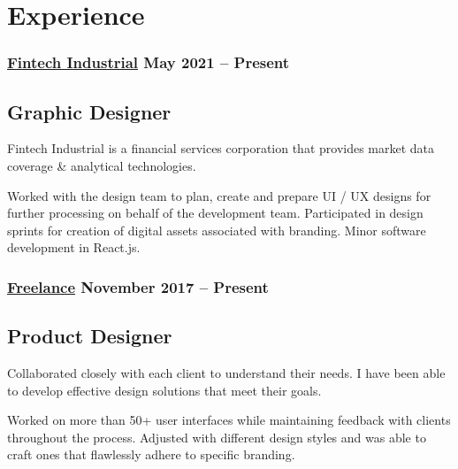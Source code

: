 \section*{Experience}
%
%
%
\subsubsection*{
  \href{https://www.linkedin.com/company/fintech-industrial/}{Fintech Industrial}
  \hspace*{\fill}
  May 2021 -- Present
}
\subsection*{Graphic Designer}
Fintech Industrial is a financial services corporation that provides market data coverage \& analytical technologies.
\smallskip
\begin{tasks}
  \task Worked with the design team to plan, create and prepare UI / UX designs for further processing on behalf of the development team.
  \task Participated in design sprints for creation of digital assets associated with branding.
  \task Minor software development in React.js.
\end{tasks}
%
%
\medskip
\subsubsection*{
  \href{https://bumbleboss.xyz/}{Freelance}
  \hspace*{\fill}
  November 2017 -- Present
}
\subsection*{Product Designer}
Collaborated closely with each client to understand their needs. I have been able to develop effective design solutions that meet their goals. 
\smallskip
\begin{tasks}
  \task Worked on more than 50+ user interfaces while maintaining feedback with clients throughout the process.
  \task Adjusted with different design styles and was able to craft ones that flawlessly adhere to specific branding.
\end{tasks}